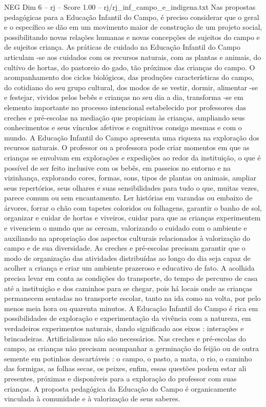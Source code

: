 \begin{textsample}{NEG Dim 6 – rj – Score 1.00 – rj/rj\_inf\_campo\_e\_indigena.txt}
Nas propostas pedagógicas para a Educação Infantil do Campo, é preciso considerar que o geral e o específico se dão em um movimento maior de construção de um projeto social, possibilitando novas relações humanas e novas concepções de sujeitos do campo e de sujeitos criança.
As práticas de cuidado na Educação Infantil do Campo articulam -se aos cuidados com os recursos naturais, com as plantas e animais, do cultivo de hortas, do pastoreio do gado, tão próximos das crianças do campo.
O acompanhamento dos ciclos biológicos, das produções características do campo, do cotidiano do seu grupo cultural, dos modos de se vestir, dormir, alimentar -se e festejar, vividos pelos bebês e crianças no seu dia a dia, transforma -se em elemento importante no processo intencional estabelecido por professores das creches e pré-escolas na mediação que propiciam às crianças, ampliando seus conhecimentos e seus vínculos afetivos e cognitivos consigo mesmas e com o mundo.
A Educação Infantil do Campo apresenta uma riqueza na exploração dos recursos naturais.
O professor ou a professora pode criar momentos em que as crianças se envolvam em explorações e expedições ao redor da instituição, o que é possível de ser feito inclusive com os bebês, em passeios no entorno e na vizinhança, explorando cores, formas, sons, tipos de plantas ou animais, ampliar seus repertórios, seus olhares e suas sensibilidades para tudo o que, muitas vezes, parece comum ou sem encantamento.
Ler histórias em varandas ou embaixo de árvores, forrar o chão com tapetes coloridos ou folhagens, garantir o banho de sol, organizar e cuidar de hortas e viveiros, cuidar para que as crianças experimentem e vivenciem o mundo que as cercam, valorizando o cuidado com o ambiente e auxiliando na apropriação dos aspectos culturais relacionados à valorização do campo e de sua diversidade.
As creches e pré-escolas precisam garantir que o modo de organização das atividades distribuídas ao longo do dia seja capaz de acolher a criança e criar um ambiente prazeroso e educativo de fato.
A acolhida precisa levar em conta as condições do transporte, do tempo de percurso de casa até a instituição e dos caminhos para se chegar, pois há locais onde as crianças permanecem sentadas no transporte escolar, tanto na ida como na volta, por pelo menos meia hora ou quarenta minutos.
A Educação Infantil do Campo é rica em possibilidades de exploração e experimentação da vivência com a natureza, em verdadeiros experimentos naturais, dando significado aos eixos : interações e brincadeiras.
Artificialismos não são necessários.
Nas creches e pré-escolas do campo, as crianças não precisam acompanhar a germinação do feijão ou de outra semente em potinhos descartáveis : o campo, o pasto, a mata, o rio, o caminho das formigas, as folhas secas, os peixes, enfim, essas questões podem estar ali presentes, próximas e disponíveis para a exploração do professor com suas crianças.
A proposta pedagógica da Educação do Campo é organicamente vinculada à comunidade e à valorização de seus saberes.

\end{textsample}
